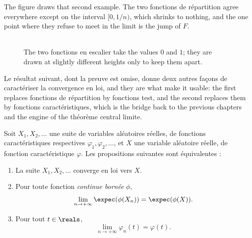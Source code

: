 The figure draws that second example. The two fonctions de répartition
agree everywhere except on the interval $[0, 1/n)$, which shrinks to nothing, and
the one point where they refuse to meet in the limit is the jump of $F$.

\begin{figure}[h!]
  \centering
  \\[2mm]
  {\footnotesize The two fonctions en escalier take the values $0$ and $1$; they
   are drawn at slightly different heights only to keep them apart.}
\end{figure}

Le résultat suivant, dont la preuve est omise, donne deux autres façons de
caractériser la convergence en loi, and they are what make it usable: the first
replaces fonctions de répartition by fonctions test, and the second replaces them
by fonctions caractéristiques, which is the bridge back to the previous chapters
and the engine of the théorème central limite.

\begin{theorem}
  Soit $X_{1}, X_{2}, \dots$ une suite de variables aléatoires réelles, de
  fonctions caractéristiques respectives $\varphi_{1}, \varphi_{2}, \dots$, et
  $X$ une variable aléatoire réelle, de fonction caractéristique $\varphi$. Les
  propositions suivantes sont équivalentes :
  \begin{enumerate}
    \item La suite $X_{1}, X_{2}, \dots$ converge en loi vers $X$.
    \item Pour toute fonction \emph{continue bornée} $\phi$,
      \[
        \lim_{n \to +\infty} \expec(\phi(X_{n})) = \expec(\phi(X)) .
      \]
    \item Pour tout $t \in \reals$,
      \[
        \lim_{n \to +\infty} \varphi_{n}(t) = \varphi(t) .
      \]
  \end{enumerate}
\end{theorem}

